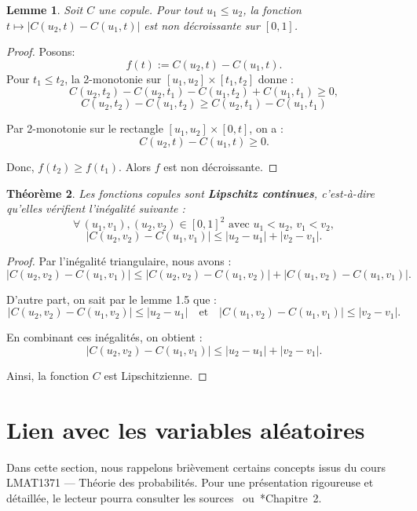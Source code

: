 \documentclass[a4paper,11pt]{amsbook}
\numberwithin{equation}{chapter}
\newtheorem{theoreme}			     {Théorème}	[chapter]
\newtheorem{lemme}	    [theoreme]	 {Lemme}
\theoremstyle{definition}
\begin{document}
\begin{lemme}\label{lemme:non_dec_cop}
Soit \( C \) une copule. Pour tout \( u_1 \leq u_2 \), la fonction \( t \mapsto |C(u_2,t) - C(u_1,t)| \) est non décroissante sur \([0,1]\).
\end{lemme}

\begin{proof}
Posons:
\[
f(t) := C(u_2,t) - C(u_1,t).
\]
Pour \( t_1 \leq t_2 \), la 2-monotonie sur \([u_1,u_2] \times [t_1,t_2]\) donne :
\[
C(u_2,t_2) - C(u_2,t_1) - C(u_1,t_2) + C(u_1,t_1) \geq 0,
\]
\[
C(u_2,t_2)  - C(u_1,t_2) \geq C(u_2,t_1) - C(u_1,t_1)
\]

Par 2-monotonie sur le rectangle \([u_1, u_2] \times [0, t]\), on a :
\[
C(u_2, t) - C(u_1, t) \geq 0.
\]

Donc, \( f(t_2) \geq f(t_1) \). Alors \( f \) est non décroissante.
\end{proof}



\begin{theoreme}\label{thm:lip_cont}
Les fonctions copules sont \textbf{Lipschitz continues}, c’est-à-dire qu’elles vérifient l’inégalité suivante :  
\[
\forall\, (u_1, v_1), (u_2, v_2) \in [0,1]^2 \text{ avec } u_1 < u_2,\, v_1 < v_2,
\]
\[
|C(u_2, v_2) - C(u_1, v_1)| \leq |u_2 - u_1| + |v_2 - v_1|.
\]
\end{theoreme}

\begin{proof}
Par l'inégalité triangulaire, nous avons :  
\[
|C(u_2, v_2) - C(u_1, v_1)| \leq |C(u_2, v_2) - C(u_1, v_2)| + |C(u_1, v_2) - C(u_1, v_1)|.
\]

D'autre part, on sait par le lemme 1.5 que :  
\[
|C(u_2, v_2) - C(u_1, v_2)| \leq |u_2 - u_1| \quad \text{et} \quad |C(u_1, v_2) - C(u_1, v_1)| \leq |v_2 - v_1|.
\]

En combinant ces inégalités, on obtient :  
\[
|C(u_2, v_2) - C(u_1, v_1)| \leq |u_2 - u_1| + |v_2 - v_1|.
\]

Ainsi, la fonction \(C\) est Lipschitzienne.     
\end{proof}

\section{Lien avec les variables aléatoires}

Dans cette section, nous rappelons brièvement certains concepts issus du cours LMAT1371 — Théorie des probabilités. Pour une présentation rigoureuse et détaillée, le lecteur pourra consulter les sources~\cite{barigou} ou~\cite{prp}*{Chapitre~2}.
\end{document}
